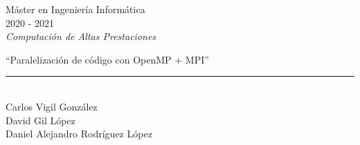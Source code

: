 \documentclass[12pt]{report} %
\begin{document}

\begin{titlepage}
	\begin{sffamily}
	\color{azulUC3M}
	\begin{center}
		\begin{figure}[H] %
		\end{figure}
		\vspace{2.5cm}
		\begin{Large}
			Máster en Ingeniería Informática\\
			2020 - 2021\\
			\vspace{2cm}
			\textsl{Computación de Altas Prestaciones}
			\bigskip

		\end{Large}
		 	{\Huge ``Paralelización de código con OpenMP + MPI''}\\
		 	\vspace*{0.5cm}
	 		\rule{10.5cm}{0.1mm}\\
			\vspace*{0.9cm}
			{\LARGE Carlos Vigil González}\\
            {\LARGE David Gil López}\\
			{\LARGE Daniel Alejandro Rodríguez López}\\
			\vspace*{1cm}
	\end{center}
	\vfill
	\color{black}
	\end{sffamily}
\end{titlepage}

\tableofcontents
\thispagestyle{fancy}

\listoffigures
\thispagestyle{fancy}
\end{document}
